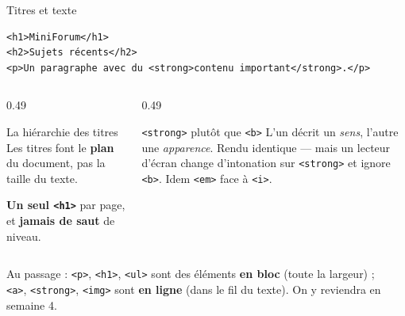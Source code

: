 \documentclass[aspectratio=169,11pt]{beamer}
\begin{document}
\begin{frame}[fragile]{Titres et texte}
\begin{lstlisting}[language=HTML5]
<h1>MiniForum</h1>
<h2>Sujets récents</h2>
<p>Un paragraphe avec du <strong>contenu important</strong>.</p>
\end{lstlisting}
  \vspace{0.15cm}
  \begin{columns}[T]
    \begin{column}{0.49\textwidth}
      \begin{alertblock}{La hiérarchie des titres}
        Les titres font le \textbf{plan} du document, pas la taille du texte.
        \vspace{0.12cm}

        \textbf{Un seul \texttt{<h1>}} par page, et \textbf{jamais de saut} de niveau.
      \end{alertblock}
    \end{column}
    \begin{column}{0.49\textwidth}
      \begin{block}{\texttt{<strong>} plutôt que \texttt{<b>}}
        L'un décrit un \textit{sens}, l'autre une \textit{apparence}. Rendu identique --- mais un lecteur d'écran change d'intonation sur \texttt{<strong>} et ignore \texttt{<b>}. Idem \texttt{<em>} face à \texttt{<i>}.
      \end{block}
    \end{column}
  \end{columns}
  \vspace{0.15cm}
  \begin{center}
    \small Au passage : \texttt{<p>}, \texttt{<h1>}, \texttt{<ul>} sont des éléments \textbf{en bloc} (toute la largeur) ;\\
    \small \texttt{<a>}, \texttt{<strong>}, \texttt{<img>} sont \textbf{en ligne} (dans le fil du texte). On y reviendra en semaine 4.
  \end{center}
\end{frame}
\end{document}
